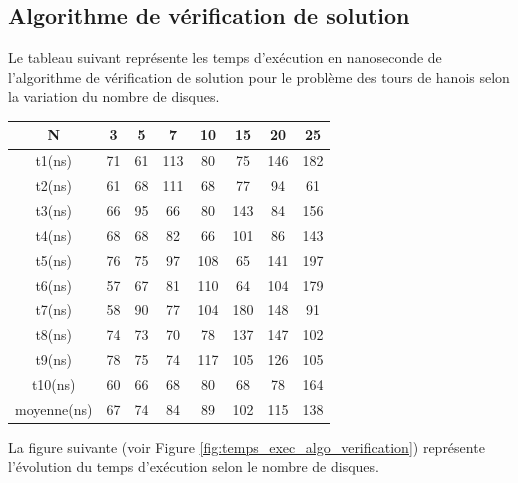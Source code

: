 \subsection{Algorithme de vérification de solution}
Le tableau suivant représente les temps d'exécution en nanoseconde de l'algorithme de vérification de solution pour le problème des tours de hanois selon la variation du nombre de disques.\\
\small
\begin{center}
    \begin{tabular}{| c | c | c | c | c | c | c | c |}
        \hline
        N & 3 & 5 & 7 & 10 & 15 & 20 & 25\\
        \hline
        t1(ns) & 71 & 61 & 113 & 80 & 75 & 146 & 182\\
        \hline
        t2(ns) & 61 & 68 & 111 & 68 & 77 & 94 & 61\\
        \hline
        t3(ns) & 66 & 95 & 66 & 80 & 143 & 84 & 156\\
        \hline
        t4(ns) & 68 & 68 & 82 & 66 & 101 & 86 & 143\\
        \hline
        t5(ns) & 76 & 75 & 97 & 108 & 65 & 141 & 197\\
        \hline
        t6(ns) & 57 & 67 & 81 & 110 & 64 & 104 & 179\\
        \hline
        t7(ns) & 58 & 90 & 77 & 104 & 180 & 148 & 91\\
        \hline
        t8(ns) & 74 & 73 & 70 & 78 & 137 & 147 & 102\\
        \hline
        t9(ns) & 78 & 75 & 74 & 117 & 105 & 126 & 105\\
        \hline
        t10(ns) & 60 & 66 & 68 & 80 & 68 & 78 & 164\\
        \hline
        moyenne(ns) & 67 & 74 & 84 & 89 & 102 & 115 & 138\\
        \hline
    \end{tabular}
\end{center}
\normalsize
\par
La figure suivante (voir Figure \ref{fig:temps_exec_algo_verification}) représente l'évolution du temps d'exécution selon le nombre de disques.

